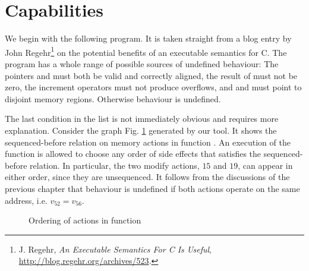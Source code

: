\documentclass[a4paper,12pt]{scrbook}
\theoremstyle{plain}
\theoremstyle{definition}
\newcommand{\cc}[1]{{\text{\footnotesize\ttfamily{#1}}}}
\begin{document}
\section{Capabilities}
We begin with the following program.   It
is taken straight from a blog entry by John Regehr\footnote{J. Regehr,
  \textit{An Executable Semantics For C Is Useful},
  \url{http://blog.regehr.org/archives/523}.} on the potential benefits of an
executable semantics for C. The program has a whole range of possible sources of
undefined behaviour: The pointers \cc{p1} and \cc{p2} must both be valid and
correctly aligned, the result of \cc{*p2} must not be zero, the increment
operators must not produce overflows, and \cc{p1} and \cc{p2} must point to
disjoint memory regions. Otherwise behaviour is undefined.

The last condition in the list is not immediately obvious and requires more
explanation. Consider the graph Fig. \ref{ptrRegehrFoo} generated by our
tool. It shows the sequenced-before relation on memory actions in function
\cc{foo}. An execution of the function is allowed to choose any order of side
effects that satisfies the sequenced-before relation. In particular, the two
modify actions, $15$ and $19$, can appear in either order, since they are
unsequenced. It follows from the discussions of the previous chapter that
behaviour is undefined if both actions operate on the same address, i.e. $v_{52}
= v_{56}$.
\begin{figure}[htb]
\centering
\caption{Ordering of actions in function \cc{foo}}
\label{ptrRegehrFoo}
\end{figure}
\end{document}
